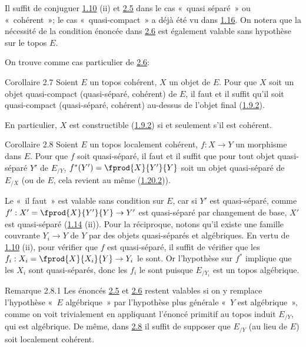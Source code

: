 Il suffit de conjuguer \hyperref[VI.prop1.10]{1.10} (ii) et \hyperref[VI.prop2.5]{2.5}
dans le cas « quasi séparé » ou « cohérent »; le cas « quasi-compact » a déjà été vu dans \hyperref[VI.cor1.16]{1.16}. On notera que
la nécessité de la condition énoncée dans \hyperref[VI.cor2.6]{2.6} est
également valable sans hypothèse sur le topos $E$.

On trouve comme cas particulier de \hyperref[VI.cor2.6]{2.6}:

\begin{enonce*}{Corollaire 2.7}
Soient $E$ un topos cohérent, $X$ un objet de $E$. Pour que $X$ soit
un objet quasi-compact (\resp quasi-séparé, \resp cohérent) de $E$, il
faut et il suffit qu'il soit quasi-compact (\resp quasi-séparé, \resp
cohérent) au-dessus de l'objet final (\hyperref[VI.subsubsec1.9.2]{1.9.2}).
\end{enonce*}

En particulier, $X$ est constructible (\hyperref[VI.subsubsec1.9.2]{1.9.2}) si et seulement s'il
est cohérent.

\begin{enonce*}{Corollaire 2.8}
Soient $E$ un topos localement cohérent, $f:X \to Y$ un morphisme dans
$E$. Pour que $f$ soit quasi-séparé, il faut et il suffit que pour
tout objet quasi-séparé $Y'$ de $E_{/Y}$, $f^{\ast} (Y') =
\fprod{X}{Y'}{Y}$ soit un objet quasi-séparé de $E_{/X}$ (ou de $E$,
cela revient au même (\hyperref[VI.subsubsec1.20.2]{1.20.2})).
\end{enonce*}

Le \pageoriginale « il faut » est valable sans condition sur $E$,
car si $Y'$ est quasi-séparé, comme $f':X'= \fprod{X}{Y'}{Y} \to Y'$ est quasi-séparé par
changement de base, $X'$ est quasi-séparé (\hyperref[VI.prop1.14]{1.14} (ii)). Pour la
réciproque, notons qu'il existe une famille couvrante $Y_i \to Y$ de
$Y$ par des objets quasi-séparés et algébriques. En vertu de \hyperref[VI.prop1.10]{1.10}
(ii), pour vérifier que $f$ est quasi-séparé, il suffit de vérifier
que les $f_i : X_i = \fprod{X}{X_i}{Y} \to Y_i$ le sont. Or
l'hypothèse sur $f^{\ast}$ implique que les $X_i$ sont quasi-séparés,
donc les $f_i$ le sont puisque $E_{/Y_i}$ est un topos algébrique.

\begin{enonce*}[remark]{Remarque 2.8.1}
Les énoncés \hyperref[VI.prop2.5]{2.5} et \hyperref[VI.cor2.6]{2.6} restent valables si on y remplace l'hypothèse
« $E$ algébrique » par l'hypothèse plus générale « $Y$ est
algébrique », comme on voit trivialement en appliquant l'énoncé
primitif au topos induit $E_{/Y}$, qui est algébrique. De même, dans
\hyperref[VI.cor2.8]{2.8} il suffit de supposer que $E_{/Y}$ (au lieu de $E$) soit
localement cohérent.
\end{enonce*}

